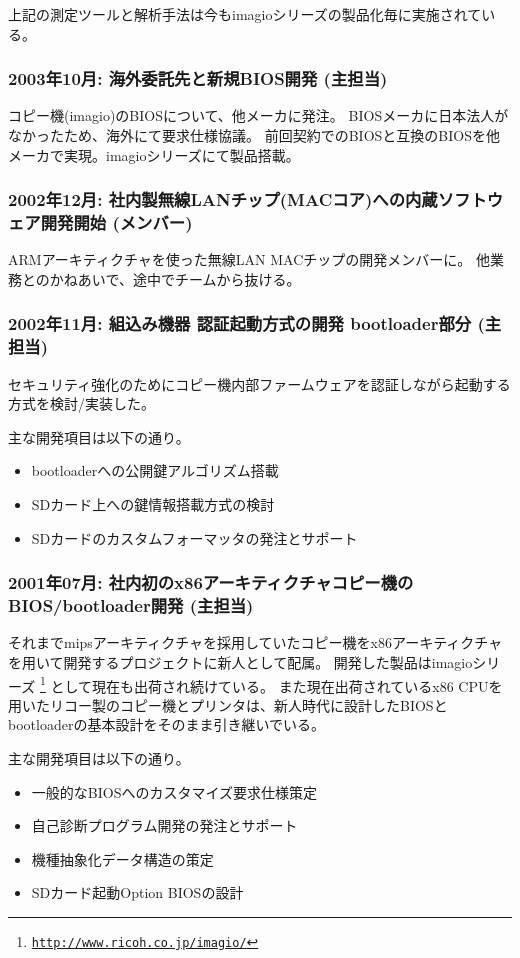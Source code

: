\documentclass[letterpaper]{article}
\begin{document}
上記の測定ツールと解析手法は今もimagioシリーズの製品化毎に実施されている。

\subsubsection*{2003年10月: 海外委託先と新規BIOS開発 (主担当)}
コピー機(imagio)のBIOSについて、他メーカに発注。
BIOSメーカに日本法人がなかったため、海外にて要求仕様協議。
前回契約でのBIOSと互換のBIOSを他メーカで実現。imagioシリーズにて製品搭載。

\subsubsection*{2002年12月: 社内製無線LANチップ(MACコア)への内蔵ソフトウェア開発開始 (メンバー)}
ARMアーキティクチャを使った無線LAN MACチップの開発メンバーに。
他業務とのかねあいで、途中でチームから抜ける。

\subsubsection*{2002年11月: 組込み機器 認証起動方式の開発 bootloader部分 (主担当)}
セキュリティ強化のためにコピー機内部ファームウェアを認証しながら起動する方式を検討/実装した。

主な開発項目は以下の通り。
\begin{itemize}
  \item bootloaderへの公開鍵アルゴリズム搭載
  \item SDカード上への鍵情報搭載方式の検討
  \item SDカードのカスタムフォーマッタの発注とサポート
\end{itemize}

\subsubsection*{2001年07月: 社内初のx86アーキティクチャコピー機のBIOS/bootloader開発 (主担当)}
それまでmipsアーキティクチャを採用していたコピー機をx86アーキティクチャを用いて開発するプロジェクトに新人として配属。
開発した製品はimagioシリーズ
\footnote{\href{http://www.ricoh.co.jp/imagio/}{\tt http://www.ricoh.co.jp/imagio/}}
として現在も出荷され続けている。
また現在出荷されているx86 CPUを用いたリコー製のコピー機とプリンタは、新人時代に設計したBIOSとbootloaderの基本設計をそのまま引き継いでいる。

主な開発項目は以下の通り。
\begin{itemize}
  \item 一般的なBIOSへのカスタマイズ要求仕様策定
  \item 自己診断プログラム開発の発注とサポート
  \item 機種抽象化データ構造の策定
  \item SDカード起動Option BIOSの設計
\end{itemize}
\end{document}
